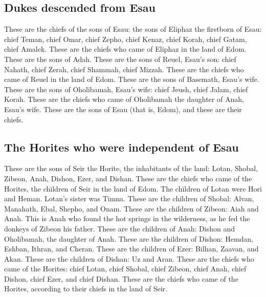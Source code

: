 \hypertarget{dukes-descended-from-esau}{%
\subsection{Dukes descended from Esau}\label{dukes-descended-from-esau}}

 These are the chiefs of the sons of Esau: the sons of
Eliphaz the firstborn of Esau: chief Teman, chief Omar, chief Zepho,
chief Kenaz,  chief Korah, chief Gatam, chief Amalek.
These are the chiefs who came of Eliphaz in the land of Edom. These are
the sons of Adah.  These are the sons of Reuel, Esau's
son: chief Nahath, chief Zerah, chief Shammah, chief Mizzah. These are
the chiefs who came of Reuel in the land of Edom. These are the sons of
Basemath, Esau's wife.  These are the sons of Oholibamah,
Esau's wife: chief Jeush, chief Jalam, chief Korah. These are the chiefs
who came of Oholibamah the daughter of Anah, Esau's wife.
 These are the sons of Esau (that is, Edom), and these
are their chiefs.

\hypertarget{the-horites-who-were-independent-of-esau}{%
\subsection{The Horites who were independent of
Esau}\label{the-horites-who-were-independent-of-esau}}

 These are the sons of Seir the Horite, the inhabitants
of the land: Lotan, Shobal, Zibeon, Anah,  Dishon, Ezer,
and Dishan. These are the chiefs who came of the Horites, the children
of Seir in the land of Edom.  The children of Lotan were
Hori and Heman. Lotan's sister was Timna.  These are the
children of Shobal: Alvan, Manahath, Ebal, Shepho, and Onam.
 These are the children of Zibeon: Aiah and Anah. This is
Anah who found the hot springs in the wilderness, as he fed the donkeys
of Zibeon his father.  These are the children of Anah:
Dishon and Oholibamah, the daughter of Anah.  These are
the children of Dishon: Hemdan, Eshban, Ithran, and Cheran.
 These are the children of Ezer: Bilhan, Zaavan, and
Akan.  These are the children of Dishan: Uz and Aran.
 These are the chiefs who came of the Horites: chief
Lotan, chief Shobal, chief Zibeon, chief Anah,  chief
Dishon, chief Ezer, and chief Dishan. These are the chiefs who came of
the Horites, according to their chiefs in the land of Seir.

